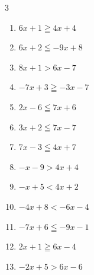 \begin{multicols}{3}
\begin{enumerate}
  \item $6x+1\geqq 4x+4$


  \item $6x+2\leqq -9x+8$


  \item $8x+1>6x-7$

        \phantom{$\displaystyle x>-4$}

  \item $-7x+3\geqq -3x-7$


  \item $2x-6\leqq 7x+6$


  \item $3x+2\leqq 7x-7$


  \item $7x-3\leqq 4x+7$


  \item $-x-9>4x+4$


  \item $-x+5<4x+2$


  \item $-4x+8<-6x-4$

        \phantom{$\displaystyle x<-6$}

  \item $-7x+6\leqq -9x-1$


\columnbreak %

\resetques

  \item $2x+1\geqq 6x-4$


  \item $-2x+5>6x-6$



\end{enumerate}
\end{multicols}
